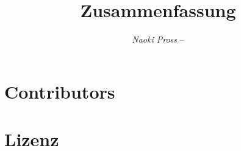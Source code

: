 \documentclass[header, margin=normal]{tex/hsrzf}
\author{\textsl{Naoki Pross} -- \texttt{\theauthoremail}}
\title{\texttt{\themodule} Zusammenfassung}
\date{\thesemester}
\begin{document}
\maketitle
\tableofcontents



% 
% 

\section{Contributors}
\thecontributors

\section{Lizenz}
\doclicenseThis
\end{document}
